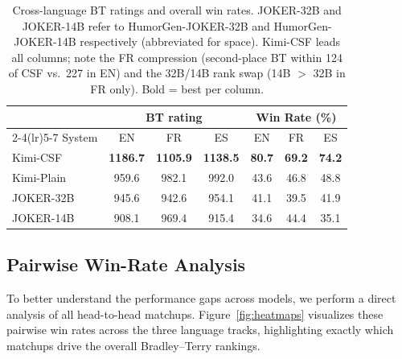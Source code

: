 \documentclass[]{ceurart}
\begin{document}
\begin{table}[t]
  \caption{Cross-language BT ratings and overall win rates.
    JOKER-32B and JOKER-14B refer to HumorGen-JOKER-32B and HumorGen-JOKER-14B
    respectively (abbreviated for space).
    Kimi-CSF leads all columns; note the FR compression (second-place BT within
    124 of CSF vs.\ 227 in EN) and the 32B/14B rank swap (14B $>$ 32B in FR
    only). Bold = best per column.}
  \label{tab:summary}
  \small
  \setlength{\tabcolsep}{4.5pt}
  \begin{tabular}{lcccccc}
    \toprule
    & \multicolumn{3}{c}{BT rating} & \multicolumn{3}{c}{Win Rate (\%)} \\
    \cmidrule(lr){2-4}\cmidrule(lr){5-7}
    System            & EN & FR & ES & EN & FR & ES \\
    \midrule
    Kimi-CSF          & \textbf{1186.7} & \textbf{1105.9} & \textbf{1138.5}
                      & \textbf{80.7}   & \textbf{69.2}   & \textbf{74.2}   \\
    Kimi-Plain        & 959.6  & 982.1  & 992.0  & 43.6 & 46.8 & 48.8 \\
    JOKER-32B         & 945.6  & 942.6  & 954.1  & 41.1 & 39.5 & 41.9 \\
    JOKER-14B         & 908.1  & 969.4  & 915.4  & 34.6 & 44.4 & 35.1 \\
    \bottomrule
  \end{tabular}
\end{table}

\subsection{Pairwise Win-Rate Analysis}
\label{sec:heatmaps}

To better understand the performance gaps across models, we perform a direct analysis of all head-to-head matchups. Figure~\ref{fig:heatmaps} visualizes these pairwise win rates across the three language tracks, highlighting exactly which matchups drive the overall Bradley--Terry rankings.
\end{document}
